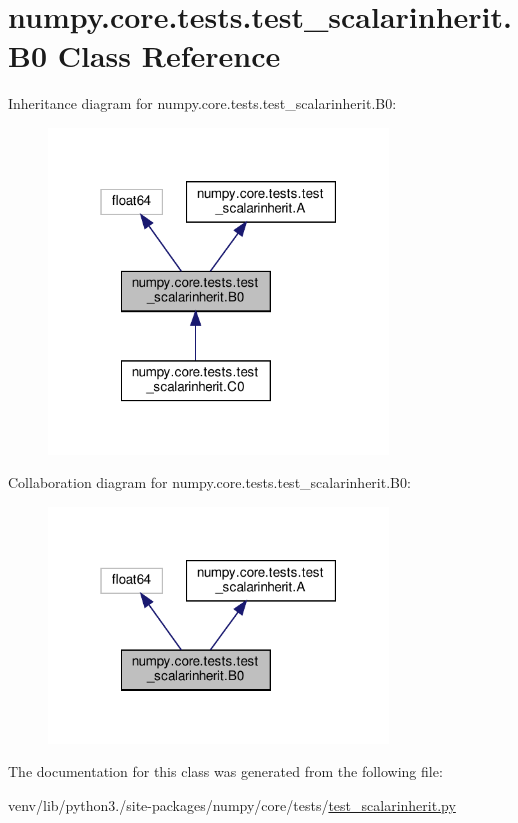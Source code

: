 \hypertarget{classnumpy_1_1core_1_1tests_1_1test__scalarinherit_1_1B0}{}\section{numpy.\+core.\+tests.\+test\+\_\+scalarinherit.\+B0 Class Reference}
\label{classnumpy_1_1core_1_1tests_1_1test__scalarinherit_1_1B0}


Inheritance diagram for numpy.\+core.\+tests.\+test\+\_\+scalarinherit.\+B0\+:
\nopagebreak
\begin{figure}[H]
\begin{center}
\leavevmode
\includegraphics[width=256pt]{classnumpy_1_1core_1_1tests_1_1test__scalarinherit_1_1B0__inherit__graph}
\end{center}
\end{figure}


Collaboration diagram for numpy.\+core.\+tests.\+test\+\_\+scalarinherit.\+B0\+:
\nopagebreak
\begin{figure}[H]
\begin{center}
\leavevmode
\includegraphics[width=256pt]{classnumpy_1_1core_1_1tests_1_1test__scalarinherit_1_1B0__coll__graph}
\end{center}
\end{figure}


The documentation for this class was generated from the following file\+:\begin{DoxyCompactItemize}
\item 
venv/lib/python3./site-\/packages/numpy/core/tests/\hyperlink{test__scalarinherit_8py}{test\+\_\+scalarinherit.\+py}\end{DoxyCompactItemize}
